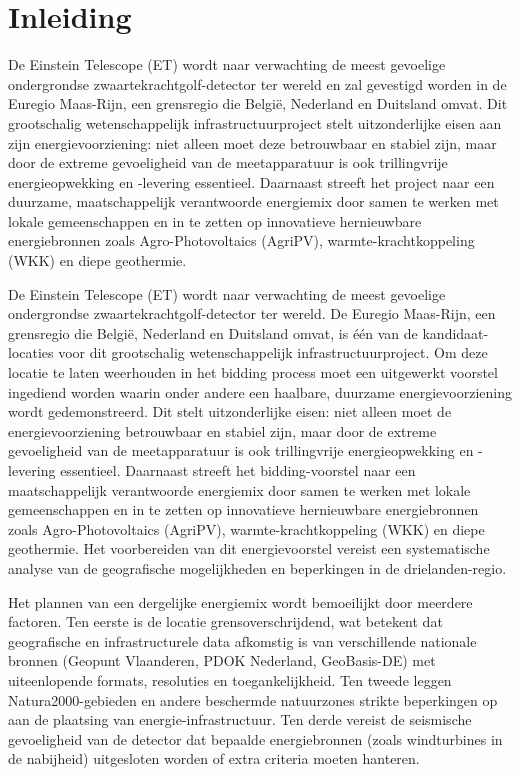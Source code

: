 \section{Inleiding}%
\label{sec:inleiding}

De Einstein Telescope (ET) wordt naar verwachting de meest gevoelige ondergrondse zwaartekrachtgolf-detector ter wereld en zal gevestigd worden in de Euregio Maas-Rijn, een grensregio die België, Nederland en Duitsland omvat. Dit grootschalig wetenschappelijk infrastructuurproject stelt uitzonderlijke eisen aan zijn energievoorziening: niet alleen moet deze betrouwbaar en stabiel zijn, maar door de extreme gevoeligheid van de meetapparatuur is ook trillingvrije energieopwekking en -levering essentieel. Daarnaast streeft het project naar een duurzame, maatschappelijk verantwoorde energiemix door samen te werken met lokale gemeenschappen en in te zetten op innovatieve hernieuwbare energiebronnen zoals Agro-Photovoltaics (AgriPV), warmte-krachtkoppeling (WKK) en diepe geothermie.

De Einstein Telescope (ET) wordt naar verwachting de meest gevoelige ondergrondse zwaartekrachtgolf-detector ter wereld. De Euregio Maas-Rijn, een grensregio die België, Nederland en Duitsland omvat, is één van de kandidaat-locaties voor dit grootschalig wetenschappelijk infrastructuurproject. Om deze locatie te laten weerhouden in het bidding process moet een uitgewerkt voorstel ingediend worden waarin onder andere een haalbare, duurzame energievoorziening wordt gedemonstreerd. Dit stelt uitzonderlijke eisen: niet alleen moet de energievoorziening betrouwbaar en stabiel zijn, maar door de extreme gevoeligheid van de meetapparatuur is ook trillingvrije energieopwekking en -levering essentieel. Daarnaast streeft het bidding-voorstel naar een maatschappelijk verantwoorde energiemix door samen te werken met lokale gemeenschappen en in te zetten op innovatieve hernieuwbare energiebronnen zoals Agro-Photovoltaics (AgriPV), warmte-krachtkoppeling (WKK) en diepe geothermie. Het voorbereiden van dit energievoorstel vereist een systematische analyse van de geografische mogelijkheden en beperkingen in de drielanden-regio.

Het plannen van een dergelijke energiemix wordt bemoeilijkt door meerdere factoren. Ten eerste is de locatie grensoverschrijdend, wat betekent dat geografische en infrastructurele data afkomstig is van verschillende nationale bronnen (Geopunt Vlaanderen, PDOK Nederland, GeoBasis-DE) met uiteenlopende formats, resoluties en toegankelijkheid. Ten tweede leggen Natura2000-gebieden en andere beschermde natuurzones strikte beperkingen op aan de plaatsing van energie-infrastructuur. Ten derde vereist de seismische gevoeligheid van de detector dat bepaalde energiebronnen (zoals windturbines in de nabijheid) uitgesloten worden of extra criteria moeten hanteren.

